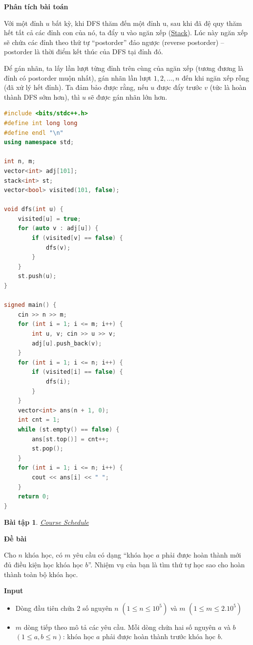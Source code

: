 \documentclass{article}
\newtheorem{baitap}{Bài tập}
\begin{document}
\textbf{Phân tích bài toán}

Với một đỉnh $u$ bất kỳ, khi DFS thăm đến một đỉnh u, sau khi đã đệ quy thăm hết tất cả các đỉnh con của nó, ta đẩy u vào ngăn xếp (\href{https://wiki.vnoi.info/algo/data-structures/Stack}{Stack}). Lúc này ngăn xếp sẽ chứa các đỉnh theo thứ tự ``postorder'' đảo ngược (reverse postorder) -- postorder là thời điểm kết thúc của DFS tại đỉnh đó. 

Để gán nhãn, ta lấy lần lượt từng đỉnh trên cùng của ngăn xếp (tương đương là đỉnh có postorder muộn nhất), gán nhãn lần lượt $1, 2, \dots, n$ đến khi ngăn xếp rỗng (đã xử lý hết đỉnh). Ta đảm bảo được rằng, nếu $u$ được đẩy trước $v$ (tức là hoàn thành DFS sớm hơn), thì $u$ sẽ được gán nhãn lớn hơn.

\begin{lstlisting}[language=C++, caption={Cài đặt Sắp xếp Tô-pô bằng DFS}, label={code:toposort}]
    #include <bits/stdc++.h>
#define int long long
#define endl "\n"
using namespace std;

int n, m;
vector<int> adj[101];
stack<int> st;
vector<bool> visited(101, false);

void dfs(int u) {
    visited[u] = true;
    for (auto v : adj[u]) {
        if (visited[v] == false) {
            dfs(v);
        }
    }
    st.push(u);
}

signed main() {
    cin >> n >> m;
    for (int i = 1; i <= m; i++) {
        int u, v; cin >> u >> v;
        adj[u].push_back(v);
    }    
    for (int i = 1; i <= n; i++) {
        if (visited[i] == false) {
            dfs(i);
        }
    }
    vector<int> ans(n + 1, 0);
    int cnt = 1;
    while (st.empty() == false) {
        ans[st.top()] = cnt++;
        st.pop();
    }
    for (int i = 1; i <= n; i++) {
        cout << ans[i] << " ";
    }
    return 0;
}

\end{lstlisting}

\begin{baitap}
    \href{https://cses.fi/problemset/task/1679}{Course Schedule}
\end{baitap}

\textbf{Đề bài}

Cho $n$ khóa học, có $m$ yêu cầu có dạng ``khóa học $a$ phải được hoàn thành mới đủ điều kiện học khóa học $b$''. Nhiệm vụ của bạn là tìm thứ tự học sao cho hoàn thành toàn bộ khóa học.

\textbf{Input}

\begin{itemize}
    \item Dòng đầu tiên chứa 2 số nguyên $n$ $(1 \leq n \leq 10^5)$ và $m$ $(1 \leq m \leq 2.10^5)$
    \item $m$ dòng tiếp theo mô tả các yêu cầu. Mỗi dòng chứa hai số nguyên $a$ và $b$ $(1 \leq a, b \leq n)$: khóa học $a$ phải được hoàn thành trước khóa học $b$.
\end{itemize}
\end{document}
